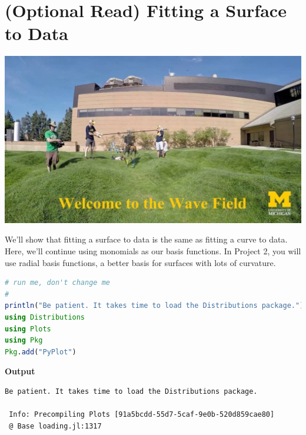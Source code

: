


\section{(Optional Read) Fitting a Surface to Data}

\begin{center}
\includegraphics[width=0.8\columnwidth]{graphics/Chap06/WaveFieldMarlo.jpg}
\end{center}

We'll show that fitting a surface to data is the same as fitting a curve to data. Here, we'll continue using monomials as our basis functions. In Project 2, you will use radial basis functions, a better basis for surfaces with lots of curvature.\\


\begin{lstlisting}[language=Julia,style=mystyle]
# run me, don't change me
#
println("Be patient. It takes time to load the Distributions package.")
using Distributions
using Plots
using Pkg
Pkg.add("PyPlot")
\end{lstlisting}
\textbf{Output} 
\begin{verbatim}
Be patient. It takes time to load the Distributions package.

 Info: Precompiling Plots [91a5bcdd-55d7-5caf-9e0b-520d859cae80]
 @ Base loading.jl:1317
\end{verbatim}


